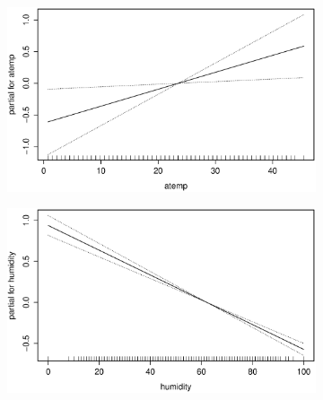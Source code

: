 \begin{figure}[H]
        \begin{subfigure}{0.4\textwidth}
          \includegraphics[width=\columnwidth]{images/non-linear/gam/gam-atemp.eps}
        \end{subfigure}
        \hspace*{\fill}
        \begin{subfigure}{0.4\textwidth}
          \includegraphics[width=\columnwidth]{images/non-linear/gam/gam-humidity.eps}
        \end{subfigure}


\end{figure}
